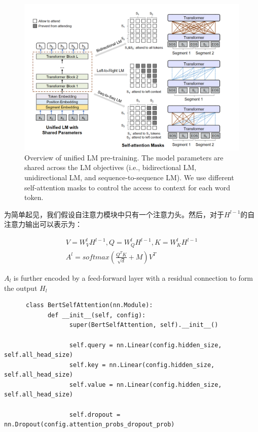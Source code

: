 \documentclass{article}
\begin{document}
\begin{sloppypar}
      \begin{figure}[h]
            \centering
            \includegraphics[scale=0.5]{uniml}
            \caption{Overview of unified LM pre-training. The model parameters are shared across the LM objectives (i.e., bidirectional LM, unidirectional LM, and sequence-to-sequence LM). We use different self-attention masks to control the access to context for each word token. }
            \label{uniml}
      \end{figure}

      为简单起见，我们假设自注意力模块中只有一个注意力头。然后，对于$H^{l-1}$的自注意力输出可以表示为：

      \begin{gather}
            V=W^l_VH^{l-1},Q=W^l_QH^{l-1},K=W^l_KH^{l-1}\\
            A^l=softmax(\frac{Q^TK}{\sqrt d}+M)V^T
      \end{gather}

      $A_l$ is further encoded by a feed-forward layer with a residual connection to form the output $H_l$


      \newpage
      \begin{lstlisting}
      class BertSelfAttention(nn.Module):
            def __init__(self, config):
                  super(BertSelfAttention, self).__init__()
                 
                  self.query = nn.Linear(config.hidden_size, self.all_head_size)
                  self.key = nn.Linear(config.hidden_size, self.all_head_size)
                  self.value = nn.Linear(config.hidden_size, self.all_head_size)

                  self.dropout = nn.Dropout(config.attention_probs_dropout_prob)


\end{lstlisting}
\end{sloppypar}
\end{document}
